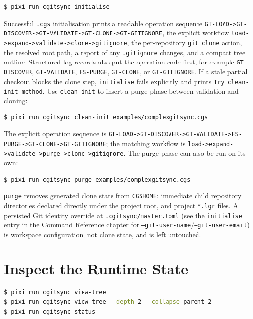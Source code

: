 \begin{lstlisting}[language=bash]
$ pixi run cgitsync initialise
\end{lstlisting}

Successful \texttt{.cgs} initialisation prints a readable operation sequence
\texttt{GT-LOAD->GT-DISCOVER->GT-VALIDATE->GT-CLONE->GT-GITIGNORE}, the
explicit workflow \texttt{load->expand->validate->clone->gitignore}, the
per-repository \texttt{git clone} action, the resolved root path, a report of
any \texttt{.gitignore} changes, and a compact tree outline. Structured log
records also put the operation code first, for example \texttt{GT-DISCOVER},
\texttt{GT-VALIDATE}, \texttt{FS-PURGE}, \texttt{GT-CLONE}, or
\texttt{GT-GITIGNORE}.
If a stale partial checkout blocks the clone step,
\texttt{initialise} fails explicitly and prints
\texttt{Try clean-init method}.  Use \texttt{clean-init} to insert a purge
phase between validation and cloning:

\begin{lstlisting}[language=bash]
$ pixi run cgitsync clean-init examples/complexgitsync.cgs
\end{lstlisting}

The explicit operation sequence is
\texttt{GT-LOAD->GT-DISCOVER->GT-VALIDATE->FS-PURGE->GT-CLONE->GT-GITIGNORE};
the matching workflow is \texttt{load->expand->validate->purge->clone->gitignore}.
The purge phase can also be run on its own:

\begin{lstlisting}[language=bash]
$ pixi run cgitsync purge examples/complexgitsync.cgs
\end{lstlisting}

\texttt{purge} removes generated clone state from \texttt{CGSHOME}: immediate
child repository directories declared directly under the project root, and
project \texttt{*.lgr} files. A persisted Git identity override at
\texttt{.cgitsync/master.toml} (see the \texttt{initialise} entry in the
Command Reference chapter for \texttt{--git-user-name}/\texttt{--git-user-email})
is workspace configuration, not clone state, and is left untouched.

\section{Inspect the Runtime State}

\begin{lstlisting}[language=bash]
$ pixi run cgitsync view-tree
$ pixi run cgitsync view-tree --depth 2 --collapse parent_2
$ pixi run cgitsync status
\end{lstlisting}

